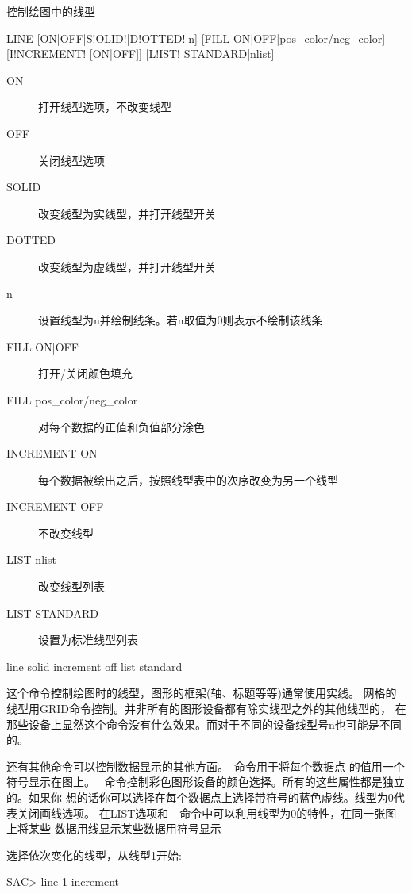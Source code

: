 \label{cmd:line}

控制绘图中的线型

\begin{SACSTX}
LINE [ON|OFF|S!OLID!|D!OTTED!|n] [FILL ON|OFF|pos\_color/neg\_color]
    [I!NCREMENT! [ON|OFF]] [L!IST! STANDARD|nlist]
\end{SACSTX}

\begin{description}
\item [ON] 打开线型选项，不改变线型
\item [OFF] 关闭线型选项
\item [SOLID] 改变线型为实线型，并打开线型开关
\item [DOTTED] 改变线型为虚线型，并打开线型开关
\item [n] 设置线型为n并绘制线条。若n取值为0则表示不绘制该线条
\item [FILL ON|OFF] 打开/关闭颜色填充
\item [FILL pos\_color/neg\_color] 对每个数据的正值和负值部分涂色
\item [INCREMENT ON] 每个数据被绘出之后，按照线型表中的次序改变为另一个线型
\item [INCREMENT OFF] 不改变线型
\item [LIST nlist] 改变线型列表
\item [LIST STANDARD] 设置为标准线型列表
\end{description}

\begin{SACDFT}
line solid increment off list standard
\end{SACDFT}

这个命令控制绘图时的线型，图形的框架(轴、标题等等)通常使用实线。
网格的线型用GRID命令控制。并非所有的图形设备都有除实线型之外的其他线型的，
在那些设备上显然这个命令没有什么效果。而对于不同的设备线型号n也可能是不同的。

还有其他命令可以控制数据显示的其他方面。~命令用于将每个数据点
的值用一个符号显示在图上。
~命令控制彩色图形设备的颜色选择。所有的这些属性都是独立的。如果你
想的话你可以选择在每个数据点上选择带符号的蓝色虚线。线型为0代表关闭画线选项。
在LIST选项和~~命令中可以利用线型为0的特性，在同一张图上将某些
数据用线显示某些数据用符号显示

选择依次变化的线型，从线型1开始:
\begin{SACCode}
SAC> line 1 increment
\end{SACCode}

